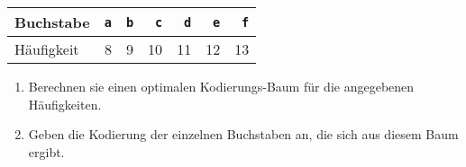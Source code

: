 \documentclass{article}
\begin{document}
\begin{center}
\begin{tabular}[t]{|l|r|r|r|r|r|r|}
\hline
Buchstabe  & \texttt{a} & \texttt{b} & \texttt{c} & \texttt{d} & \texttt{e} & \texttt{f} \\
\hline
H\"aufigkeit &          8 &          9 &         10 &         11 &         12 &         13 \\
\hline
\end{tabular}
\end{center}
\begin{enumerate}
\item Berechnen sie einen optimalen Kodierungs-Baum f\"ur die angegebenen H\"aufigkeiten.
\item Geben die Kodierung der einzelnen Buchstaben an, die sich aus diesem Baum ergibt.
\end{enumerate}
\end{document}
